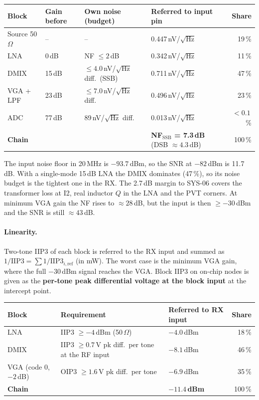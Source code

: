 \par\medskip\noindent\small
\begin{tabularx}{\textwidth}{@{}l l l L r@{}}
	\toprule
	\textbf{Block} & \textbf{Gain before} & \textbf{Own noise (budget)} & \textbf{Referred to input pin} & \textbf{Share} \\
	\midrule
	Source 50\,$\Omega$ & -- & -- & 0.447\,nV/$\sqrt{\mathrm{Hz}}$ & 19\,\% \\
	LNA & 0\,dB & NF $\leq 2$\,dB & 0.342\,nV/$\sqrt{\mathrm{Hz}}$ & 11\,\% \\
	DMIX & 15\,dB & $\leq 4.0$\,nV/$\sqrt{\mathrm{Hz}}$ diff.\ (SSB) & 0.711\,nV/$\sqrt{\mathrm{Hz}}$ & 47\,\% \\
	VGA + LPF & 23\,dB & $\leq 7.0$\,nV/$\sqrt{\mathrm{Hz}}$ diff. & 0.496\,nV/$\sqrt{\mathrm{Hz}}$ & 23\,\% \\
	ADC & 77\,dB & 89\,nV/$\sqrt{\mathrm{Hz}}$ diff. & 0.013\,nV/$\sqrt{\mathrm{Hz}}$ & $< 0.1$\,\% \\
	\midrule
	\textbf{Chain} & & & \textbf{NF$_\mathrm{SSB}$ = 7.3\,dB} (DSB $\approx 4.3$\,dB) & 100\,\% \\
	\bottomrule
\end{tabularx}\par\normalsize

\medskip
\noindent The input noise floor in 20\,MHz is $-93.7$\,dBm, so the SNR at $-82$\,dBm is
11.7\,dB. With a single-mode 15\,dB LNA the DMIX dominates (47\,\%), so its
noise budget is the tightest one in the RX. The 2.7\,dB margin to SYS-06 covers the
transformer loss at I2, real inductor $Q$ in the LNA and the PVT corners. At minimum VGA
gain the NF rises to $\approx 28$\,dB, but the input is then $\geq -30$\,dBm and the
SNR is still $\approx 43$\,dB.

\paragraph{Linearity.}
Two-tone IIP3 of each block is referred to the RX input and summed as
$1/\mathrm{IIP3} = \sum 1/\mathrm{IIP3}_{i,\mathrm{ref}}$ (in mW). The worst case is
the minimum VGA gain, where the full $-30$\,dBm signal reaches the VGA. Block IIP3 on
on-chip nodes is given as the \textbf{per-tone peak differential voltage at the block
input} at the intercept point.

\par\medskip\noindent\small
\begin{tabularx}{\textwidth}{@{}l L l r@{}}
	\toprule
	\textbf{Block} & \textbf{Requirement} & \textbf{Referred to RX input} & \textbf{Share} \\
	\midrule
	LNA & IIP3 $\geq -4$\,dBm (50\,$\Omega$) & $-4.0$\,dBm & 18\,\% \\
	DMIX & IIP3 $\geq 0.7$\,V pk diff.\ per tone at the RF input & $-8.1$\,dBm & 46\,\% \\
	VGA (code 0, $-2$\,dB) & OIP3 $\geq 1.6$\,V pk diff.\ per tone & $-6.9$\,dBm & 35\,\% \\
	\midrule
	\textbf{Chain} & & \textbf{$-11.4$\,dBm} & 100\,\% \\
	\bottomrule
\end{tabularx}\par\normalsize

